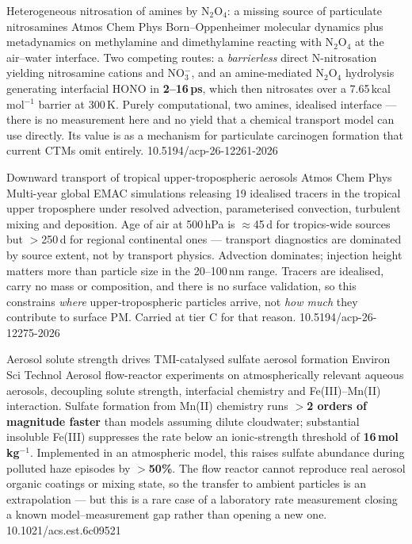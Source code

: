 \documentclass[10pt]{article}
\begin{document}
{Heterogeneous nitrosation of amines by N$_2$O$_4$: a missing source of particulate
nitrosamines}
{Atmos Chem Phys}
{Born--Oppenheimer molecular dynamics plus metadynamics on methylamine and
dimethylamine reacting with N$_2$O$_4$ at the air--water interface. Two competing routes:
a \emph{barrierless} direct N-nitrosation yielding nitrosamine cations and NO$_3^-$, and
an amine-mediated N$_2$O$_4$ hydrolysis generating interfacial HONO in
\textbf{2--16\,ps}, which then nitrosates over a 7.65\,kcal\,mol$^{-1}$ barrier at 300\,K.
Purely computational, two amines, idealised interface --- there is no measurement here and
no yield that a chemical transport model can use directly. Its value is as a mechanism
for particulate carcinogen formation that current CTMs omit entirely.}
{10.5194/acp-26-12261-2026}

{Downward transport of tropical upper-tropospheric aerosols}
{Atmos Chem Phys}
{Multi-year global EMAC simulations releasing 19 idealised tracers in the tropical upper
troposphere under resolved advection, parameterised convection, turbulent mixing and
deposition. Age of air at 500\,hPa is $\approx$45\,d for tropics-wide sources but
$>$250\,d for regional continental ones --- transport diagnostics are dominated by source
extent, not by transport physics. Advection dominates; injection height matters more than
particle size in the 20--100\,nm range. Tracers are idealised, carry no mass or
composition, and there is no surface validation, so this constrains \emph{where}
upper-tropospheric particles arrive, not \emph{how much} they contribute to surface PM.
Carried at tier C for that reason.}
{10.5194/acp-26-12275-2026}


{Aerosol solute strength drives TMI-catalysed sulfate aerosol formation}
{Environ Sci Technol}
{Aerosol flow-reactor experiments on atmospherically relevant aqueous aerosols,
decoupling solute strength, interfacial chemistry and Fe(III)--Mn(II) interaction.
Sulfate formation from Mn(II) chemistry runs \textbf{$>$2 orders of magnitude faster}
than models assuming dilute cloudwater; substantial insoluble Fe(III) suppresses the rate
below an ionic-strength threshold of \textbf{16\,mol\,kg$^{-1}$}. Implemented in an
atmospheric model, this raises sulfate abundance during polluted haze episodes by
\textbf{$>$50\%}. The flow reactor cannot reproduce real aerosol organic coatings or
mixing state, so the transfer to ambient particles is an extrapolation --- but this is a
rare case of a laboratory rate measurement closing a known model--measurement gap rather
than opening a new one.}
{10.1021/acs.est.6c09521}
\end{document}
